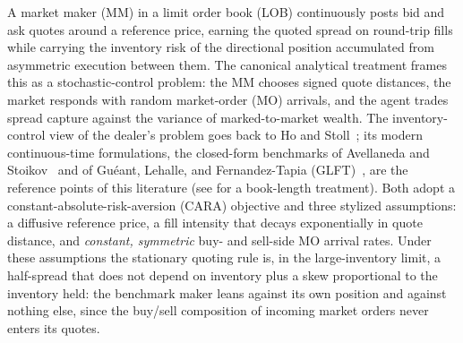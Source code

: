 \documentclass[11pt,a4paper]{article}
\theoremstyle{plain}
\theoremstyle{definition}
\begin{document}
A market maker (MM) in a limit order book (LOB) continuously posts bid and
ask quotes around a reference price, earning the quoted spread on round-trip
fills while carrying the inventory risk of the directional position
accumulated from asymmetric execution between them.  The canonical analytical
treatment frames this as a stochastic-control problem: the MM chooses signed
quote distances, the market responds with random market-order (MO) arrivals,
and the agent trades spread capture against the variance of marked-to-market
wealth.  The inventory-control view of the dealer's problem goes back to Ho and
Stoll~\cite{HoStoll1981}; its modern continuous-time formulations, the
closed-form benchmarks of Avellaneda and
Stoikov~\cite{AvellanedaStoikov2008} and of Gu\'eant, Lehalle, and
Fernandez-Tapia (GLFT)~\cite{GLFT2013}, are the reference points of this
literature (see \cite{Gueant2016} for a book-length treatment).
Both adopt a constant-absolute-risk-aversion (CARA) objective
and three stylized assumptions: a diffusive reference price, a fill intensity
that decays exponentially in quote distance, and \emph{constant, symmetric}
buy- and sell-side MO arrival rates.  Under these assumptions the stationary
quoting rule is, in the large-inventory limit, a half-spread that does not
depend on inventory plus a skew proportional to the inventory held: the
benchmark maker leans against its own position and against nothing else, since
the buy/sell composition of incoming market orders never enters its quotes.
\end{document}

